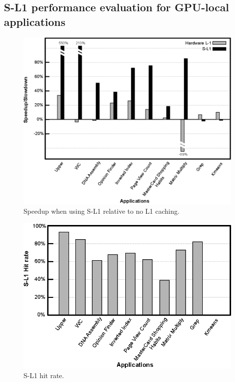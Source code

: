 \subsection{S-L1 performance evaluation for GPU-local applications}
\label{sec:perfevaluation}

\begin{figure}[t]
\center
\includegraphics[scale=0.7]{1speedups.eps}
\vspace{-0.0cm}
\caption{\footnotesize\textnormal{Speedup when using S-L1 relative to no L1 caching.}}
\label{fig:perfbenefit}
\end{figure}
\vspace{-0.0cm}

\begin{figure}[t]
\center
\includegraphics[scale=0.9]{3memoryAcceessReuction.eps}
\vspace{-0.0cm}
\caption{\footnotesize\textnormal{S-L1 hit rate.}}
\label{fig:sl1hitrate}
\end{figure}


